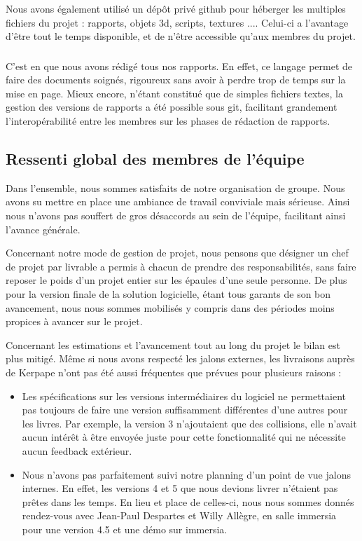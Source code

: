 Nous avons également utilisé un dépôt privé github pour héberger les multiples fichiers du projet : rapports, objets 3d, scripts, textures ....
Celui-ci a l'avantage d'être tout le temps disponible, et de n'être accessible qu'aux membres du projet.

\subsubsection{\Latex}

C'est en \Latex que nous avons rédigé tous nos rapports.
En effet, ce langage permet de faire des documents soignés, rigoureux sans avoir à perdre trop de temps sur la mise en page.
Mieux encore, \Latex n'étant constitué que de simples fichiers textes, la gestion des versions de rapports a été possible sous git, facilitant grandement l'interopérabilité entre les membres sur les phases de rédaction de rapports.

\subsection{Ressenti global des membres de l'équipe}

Dans l'ensemble, nous sommes satisfaits de notre organisation de groupe. 
Nous avons su mettre en place une ambiance de travail conviviale mais sérieuse. 
Ainsi nous n'avons pas souffert de gros désaccords au sein de l'équipe, facilitant ainsi l'avance générale.

Concernant notre mode de gestion de projet, nous pensons que désigner un chef de projet par livrable a permis à chacun de prendre des responsabilités, sans faire reposer le poids d'un projet entier sur les épaules d'une seule personne.
De plus pour la version finale de la solution logicielle, étant tous garants de son bon avancement, nous nous sommes mobilisés y compris dans des périodes moins propices à avancer sur le projet.

Concernant les estimations et l'avancement tout au long du projet le bilan est plus mitigé.
Même si nous avons respecté les jalons externes, les livraisons auprès de Kerpape n'ont pas été aussi fréquentes que prévues pour plusieurs raisons :

\begin{itemize}
  \item Les spécifications sur les versions intermédiaires du logiciel ne permettaient pas toujours de faire une version suffisamment différentes d'une autres pour les livres.
  Par exemple, la version 3 n'ajoutaient que des collisions, elle n'avait aucun intérêt à être envoyée juste pour cette fonctionnalité qui ne nécessite aucun feedback extérieur.
  \item Nous n'avons pas parfaitement suivi notre planning d'un point de vue jalons internes. En effet, les versions 4 et 5 que nous devions livrer n'étaient pas prêtes dans les temps. En lieu et place de celles-ci, nous nous sommes donnés rendez-vous avec Jean-Paul Despartes et Willy Allègre, en salle immersia pour une version 4.5 et une démo sur immersia.
 \end{itemize}
 
